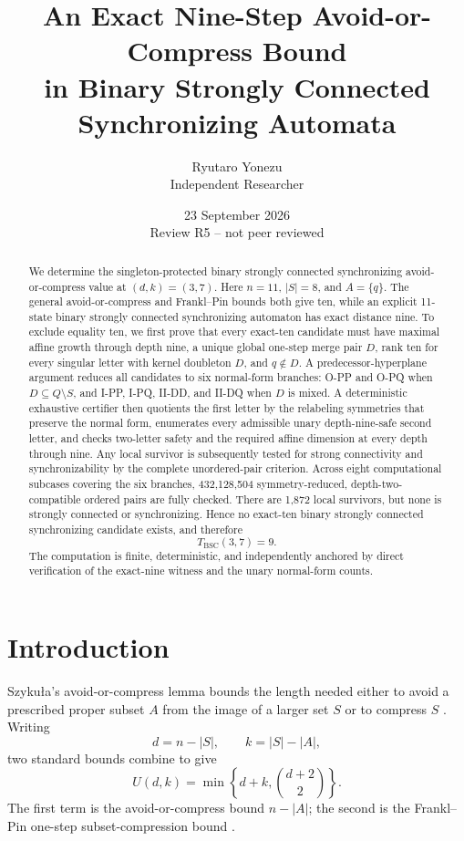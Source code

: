 \documentclass[11pt]{article}
\title{An Exact Nine-Step Avoid-or-Compress Bound\\in Binary Strongly Connected Synchronizing Automata}
\author{Ryutaro Yonezu\\Independent Researcher}
\date{23 September 2026\\Review R5 -- not peer reviewed}
\theoremstyle{definition}
\theoremstyle{remark}
\newcommand{\BSC}{\mathrm{BSC}}
\begin{document}
\maketitle

\begin{abstract}
We determine the singleton-protected binary strongly connected synchronizing avoid-or-compress value at $(d,k)=(3,7)$. Here $n=11$, $|S|=8$, and $A=\{q\}$. The general avoid-or-compress and Frankl--Pin bounds both give ten, while an explicit 11-state binary strongly connected synchronizing automaton has exact distance nine. To exclude equality ten, we first prove that every exact-ten candidate must have maximal affine growth through depth nine, a unique global one-step merge pair $D$, rank ten for every singular letter with kernel doubleton $D$, and $q\notin D$. A predecessor-hyperplane argument reduces all candidates to six normal-form branches: O-PP and O-PQ when $D\subseteq Q\setminus S$, and I-PP, I-PQ, II-DD, and II-DQ when $D$ is mixed. A deterministic exhaustive certifier then quotients the first letter by the relabeling symmetries that preserve the normal form, enumerates every admissible unary depth-nine-safe second letter, and checks two-letter safety and the required affine dimension at every depth through nine. Any local survivor is subsequently tested for strong connectivity and synchronizability by the complete unordered-pair criterion. Across eight computational subcases covering the six branches, 432,128,504 symmetry-reduced, depth-two-compatible ordered pairs are fully checked. There are 1,872 local survivors, but none is strongly connected or synchronizing. Hence no exact-ten binary strongly connected synchronizing candidate exists, and therefore
\[
T_{\BSC}(3,7)=9.
\]
The computation is finite, deterministic, and independently anchored by direct verification of the exact-nine witness and the unary normal-form counts.
\end{abstract}

\section{Introduction}
Szyku\l a's avoid-or-compress lemma bounds the length needed either to avoid a prescribed proper subset $A$ from the image of a larger set $S$ or to compress $S$ \cite{Szykula2018,Szykula2026}. Writing
\[
d=n-|S|,\qquad k=|S|-|A|,
\]
two standard bounds combine to give
\begin{equation}\label{eq:U}
U(d,k)=\min\left\{d+k,\binom{d+2}{2}\right\}.
\end{equation}
The first term is the avoid-or-compress bound $n-|A|$; the second is the Frankl--Pin one-step subset-compression bound \cite{Volkov2022,Szykula2026}.
\end{document}
